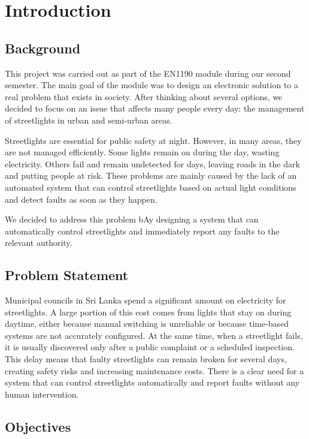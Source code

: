 \documentclass{article}
\begin{document}
\vspace{0.5cm}
\section{Introduction}

\subsection{Background}

This project was carried out as part of the EN1190 module during our second semester. The main goal of the module was to design an electronic solution to a real problem that exists in society. After thinking about several options, we decided to focus on an issue that affects many people every day: the management of streetlights in urban and semi-urban areas.

Streetlights are essential for public safety at night. However, in many areas, they are not managed efficiently. Some lights remain on during the day, wasting electricity. Others fail and remain undetected for days, leaving roads in the dark and putting people at risk. These problems are mainly caused by the lack of an automated system that can control streetlights based on actual light conditions and detect faults as soon as they happen.

We decided to address this problem bAy designing a system that can automatically control streetlights and immediately report any faults to the relevant authority.

\subsection{Problem Statement}

Municipal councils in Sri Lanka spend a significant amount on electricity for streetlights. A large portion of this cost comes from lights that stay on during daytime, either because manual switching is unreliable or because time-based systems are not accurately configured. At the same time, when a streetlight fails, it is usually discovered only after a public complaint or a scheduled inspection. This delay means that faulty streetlights can remain broken for several days, creating safety risks and increasing maintenance costs. There is a clear need for a system that can control streetlights automatically and report faults without any human intervention.

\subsection{Objectives}
\end{document}
